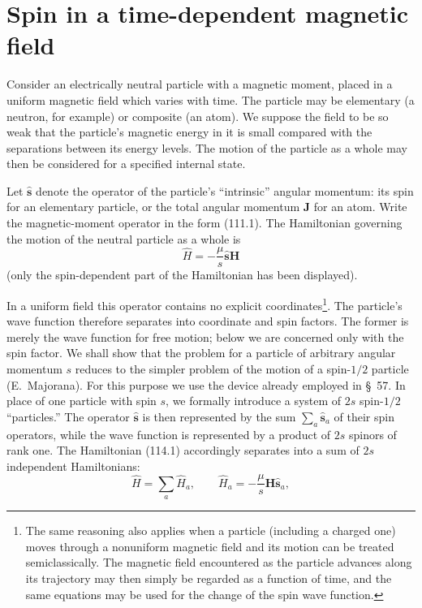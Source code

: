\section{Spin in a time-dependent magnetic field}

Consider an electrically neutral particle with a magnetic moment, placed in a
uniform magnetic field which varies with time. The particle may be elementary
(a neutron, for example) or composite (an atom). We suppose the field to be so
weak that the particle's magnetic energy in it is small compared with the
separations between its energy levels. The motion of the particle as a whole
may then be considered for a specified internal state.

Let $\hat{\mathbf s}$ denote the operator of the particle's ``intrinsic''
angular momentum: its spin for an elementary particle, or the total angular
momentum $\mathbf J$ for an atom. Write the magnetic-moment operator in the
form (111.1). The Hamiltonian governing the motion of the neutral particle as
a whole is
\begin{equation}
 \widehat H=-\frac{\mu}{s}\hat{\mathbf s}\mathbf H
 \tag{114.1}
\end{equation}
(only the spin-dependent part of the Hamiltonian has been displayed).

In a uniform field this operator contains no explicit coordinates\footnote{The
same reasoning also applies when a particle (including a charged one) moves
through a nonuniform magnetic field and its motion can be treated
semiclassically. The magnetic field encountered as the particle advances
along its trajectory may then simply be regarded as a function of time, and
the same equations may be used for the change of the spin wave function.}.
The particle's wave function therefore separates into coordinate and spin
factors. The former is merely the wave function for free motion; below we are
concerned only with the spin factor. We shall show that the problem for a
particle of arbitrary angular momentum $s$ reduces to the simpler problem of
the motion of a spin-$1/2$ particle (E.~Majorana). For this purpose we use the
device already employed in §~57. In place of one particle with spin $s$, we
formally introduce a system of $2s$ spin-$1/2$ ``particles.'' The operator
$\hat{\mathbf s}$ is then represented by the sum
$\sum_a\hat{\mathbf s}_a$ of their spin operators, while the wave function is
represented by a product of $2s$ spinors of rank one. The Hamiltonian (114.1)
accordingly separates into a sum of $2s$ independent Hamiltonians:
\begin{equation}
 \widehat H=\sum_a\widehat H_a,\qquad
 \widehat H_a=-\frac{\mu}{s}\mathbf H\hat{\mathbf s}_a,
 \tag{114.2}
\end{equation}

